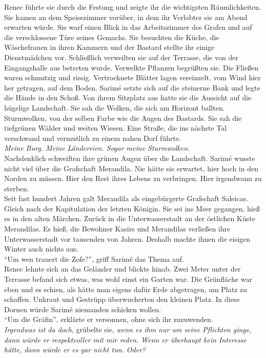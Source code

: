Renec führte sie durch die Festung und zeigte ihr die wichtigsten Räumlichkeiten. Sie kamen an dem 
Speisezimmer vorüber, in dem ihr Verlobter sie am Abend erwarten würde. Sie warf einen Blick in das 
Arbeitszimmer des Grafen und auf die verschlossene Türe seines Gemachs. Sie besuchten die Küche, 
die Wäschefrauen in ihren Kammern und der Bastard stellte ihr einige Dienstmädchen vor. Schließlich 
verweilten sie auf der Terrasse, die von der Eingangshalle aus betreten wurde. Verwelkte Pflanzen 
begrüßten sie. Die Fließen waren schmutzig und rissig. Vertrocknete Blätter lagen vereinzelt, vom 
Wind hier her getragen, auf dem Boden. Sarimé setzte sich auf die steinerne Bank und legte die 
Hände in den Schoß. Von ihrem Sitzplatz aus hatte sie die Aussicht auf die hügelige Landschaft. 
Sie sah die Wolken, die sich am Horizont ballten. Sturmwolken, von der selben Farbe wie die Augen 
des Bastards. Sie sah die tiefgrünen Wälder und weiten Wiesen. Eine Straße, die ins nächste Tal 
verschwand und vermutlich zu einem nahen Dorf führte.\\
\textit{Meine Burg. Meine Ländereien. Sogar meine Sturmwolken.}\\
Nachdenklich schweiften ihre grünen Augen über die Landschaft. Sarimé wusste nicht viel über die 
Grafschaft Merandila. Nie hätte sie erwartet, hier hoch in den Norden zu müssen. Hier den Rest 
ihres Lebens zu verbringen. Hier irgendwann zu sterben.\\
Seit fast hundert Jahren galt Merandila als eingebürgerte Grafschaft Saleicas. Gleich nach der 
Kapitulation der letzten Königin. Sie sei ins Meer gegangen, hieß es in den alten Märchen. Zurück 
in die Unterwasserstadt an der östlichen Küste Merandilas. Es hieß, die Bewohner Kasirs und 
Merandilas verließen ihre Unterwasserstadt vor tausenden von Jahren. Deshalb machte ihnen die 
eisigen Winter auch nichts aus.\\
``Um wen trauert die Zofe?'', griff Sarimé das Thema auf.\\
Renec lehnte sich an das Geländer und blickte hinab. Zwei Meter unter der Terrasse befand sich 
etwas, was wohl einst ein Garten war. Die Grünfläche war eben und es schien, als hätte man eigens 
dafür Erde abgetragen, um Platz zu schaffen. Unkraut und Gestrüpp überwucherten den kleinen Platz. 
In diese Dornen würde Sarimé niemanden schicken wollen.\\
``Um die Gräfin'', erklärte er versonnen, ohne sich ihr zuzuwenden.\\
\textit{Irgendwas ist da doch}, grübelte sie, \textit{wenn es ihm nur um seine Pflichten ginge, 
dann würde er respektvoller mit mir reden. Wenn er überhaupt kein Interesse hätte, dann würde er es 
gar nicht tun. Oder?}\\
